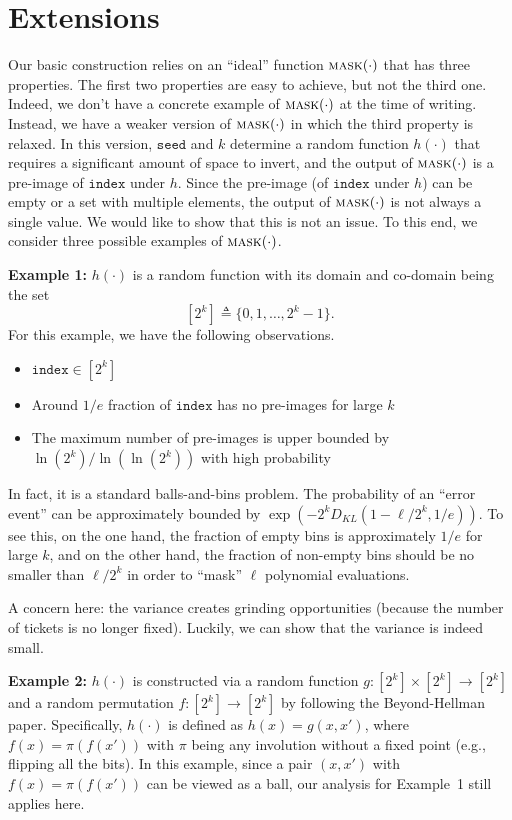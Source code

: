 \documentclass[12pt,draftcls,onecolumn]{IEEEtran}
\newcommand{\seed}{\texttt{seed}}
\newcommand{\ind}{\texttt{index}}
\newcommand{\mask}{\textsc{mask}}
\begin{document}
\section{Extensions}

Our basic construction relies on an ``ideal'' function $\mask(\cdot)$ that has three properties. The first two properties are easy to achieve, but not the third one. Indeed, we don't have a concrete example of $\mask(\cdot)$ at the time of writing. Instead, we have a weaker version of $\mask(\cdot)$ in which the third property is relaxed. In this version, $\seed$ and $k$ determine a random function $h(\cdot)$ that requires a significant amount 
of space to invert, and the output of $\mask(\cdot)$ is a pre-image of $\ind$ under $h$. Since the pre-image (of $\ind$ under $h$) can be empty or a set with multiple elements, the output of $\mask(\cdot)$ is not always a single value. We would like to show that this is not an issue.
To this end, we consider three possible examples of $\mask(\cdot)$.

{\bf Example 1:} $h(\cdot)$ is a random function with its domain and co-domain being the set
\[
[2^k] \triangleq \{ 0, 1, \ldots, 2^k - 1  \}.
\]
For this example, we have the following observations.
\begin{itemize}
    \item $\ind \in [2^k]$
    \item Around $1/e$ fraction of $\ind$ has no pre-images for large $k$
    \item The maximum number of pre-images is upper bounded by $\ln(2^k)/\ln\left( \ln(2^k) \right)$ with high probability
\end{itemize}

In fact, it is a standard balls-and-bins problem. The probability of an ``error event'' can be approximately bounded by $\exp\left(- 2^k D_{KL}(1 - \ell/2^k, 1/e) \right)$. To see this, on the one hand, the fraction of empty bins is approximately $1/e$ for large $k$, and on the other hand, the fraction of non-empty bins should be no smaller than $\ell/2^{k}$ in order to ``mask'' $\ell$ polynomial evaluations.

A concern here: the variance creates grinding opportunities (because the number of tickets is no longer fixed). Luckily, we can show that the variance is indeed small.

{\bf Example 2:} $h(\cdot)$ is constructed via a random function $g : [2^k] \times [2^k] \to [2^k]$
and a random permutation $f: [2^k] \to [2^k]$ by following the Beyond-Hellman paper. Specifically, 
$h(\cdot)$ is defined as $h(x) = g(x, x')$, where $f(x) = \pi( f(x') )$ with $\pi$ being any involution
without a fixed point (e.g., flipping all the bits). In this example, since a pair $(x, x')$ with $f(x) = \pi( f(x') )$ can be viewed as a ball, our analysis for Example~1 still applies here. 
\end{document}
